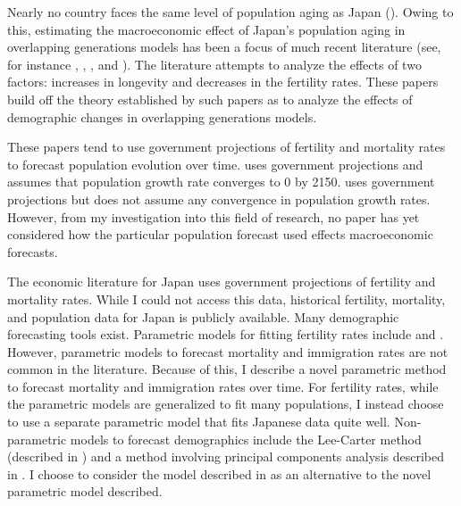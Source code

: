 \documentclass[10pt]{article}
\renewcommand{\thesection}{\arabic{section}}
\renewcommand{\section}[2][]{\oldsection[#1]{#2}\index{#1}\label{sec:\thesection}}
\numberwithin{equation}{subsection}
\begin{document}

\section{Introduction}

\par Nearly no country faces the same level of population aging as Japan (\cite{MOS2016}). Owing to this, estimating the macroeconomic effect of Japan's population aging in overlapping generations models has been a focus of much recent literature (see, for instance \cite{IKKB2005}, \cite{CII2007}, \cite{K2015}, and \cite{MOS2016}). The literature attempts to analyze the effects of two factors: increases in longevity and decreases in the fertility rates. These papers build off the theory established by such papers as \cite{M1999} to analyze the effects of demographic changes in overlapping generations models.

\par These papers tend to use government projections of fertility and mortality rates to forecast population evolution over time. \cite{K2015} uses government projections and assumes that population growth rate converges to 0 by 2150. \cite{MOS2016} uses government projections but does not assume any convergence in population growth rates. However, from my investigation into this field of research, no paper has yet considered how the particular population forecast used effects macroeconomic forecasts.

\par The economic literature for Japan uses government projections of fertility and mortality rates. While I could not access this data, historical fertility, mortality, and population data for Japan is publicly available. Many demographic forecasting tools exist. Parametric models for fitting fertility rates include \cite{HDFSB2019} and \cite{MS2011}. However, parametric models to forecast mortality and immigration rates are not common in the literature. Because of this, I describe a novel parametric method to forecast mortality and immigration rates over time. For fertility rates, while the parametric models are generalized to fit many populations, I instead choose to use a separate parametric model that fits Japanese data quite well. Non-parametric models to forecast demographics include the Lee-Carter method (described in \cite{GK2007}) and a method involving principal components analysis described in \cite{alt_demo_paper}. I choose to consider the model described in \cite{alt_demo_paper} as an alternative to the novel parametric model described.
\end{document}
